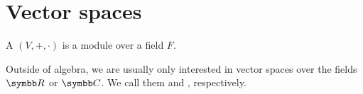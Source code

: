 \section{Vector spaces}\label{sec:vector_spaces}

\begin{definition}\label{def:vector_space}
  A  $(V, +, \cdot)$ is a module over a field $F$.
\end{definition}

\begin{note}\label{note:real_vector_space}
  Outside of algebra, we are usually only interested in vector spaces over the fields $\BB{R}$ or $\BB{C}$. We call them  and , respectively.
\end{note}

